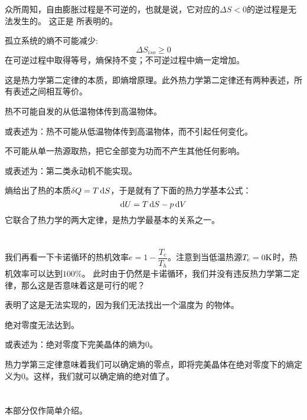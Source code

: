 众所周知，自由膨胀过程是不可逆的，也就是说，它对应的$\Delta S<0$的逆过程是无法发生的。
这正是 所表明的。
\begin{law}
    孤立系统的熵不可能减少:
    \begin{equation}
        \Delta S_{iso} \geq 0
        \nonumber
    \end{equation}
    在可逆过程中取得等号，熵保持不变；不可逆过程中熵一定增加。
\end{law}
这是热力学第二定律的本质，即熵增原理。此外热力学第二定律还有两种表述，所有表述之间相互等价。
\begin{law}
    热不可能自发的从低温物体传到高温物体。

    或表述为：热不可能从低温物体传到高温物体，而不引起任何变化。
\end{law}
\begin{law}
    不可能从单一热源取热，把它全部变为功而不产生其他任何影响。

    或表述为：第二类永动机不能实现。
\end{law}
熵给出了热的本质$\delta{Q} = T\dif{S}$，于是就有了下面的热力学基本公式：
\begin{equation}
    \dif{U} = T\dif{S}-p\dif{V}
    \nonumber
\end{equation}
它联合了热力学的两大定律，是热力学最基本的关系之一。
\section[热力学第三定律]{}
我们再看一下卡诺循环的热机效率$e = 1-\dfrac{T_c}{T_h}$。注意到当低温热源$T_c = 0 \rm{K}$时，热机效率可以达到$100\%$。
此时由于仍然是卡诺循环，我们并没有违反热力学第二定律，那么这是否意味着这是可行的呢？

表明了这是无法实现的，因为我们无法找出一个温度为 
的物体。
\begin{law}
    绝对零度无法达到。

    或表述为：绝对零度下完美晶体的熵为$0$。
\end{law}
热力学第三定律意味着我们可以确定熵的零点，即将完美晶体在绝对零度下的熵定义为$0$。这样，我们就可以确定熵的绝对值了。
\section[信息]{}
本部分仅作简单介绍。

